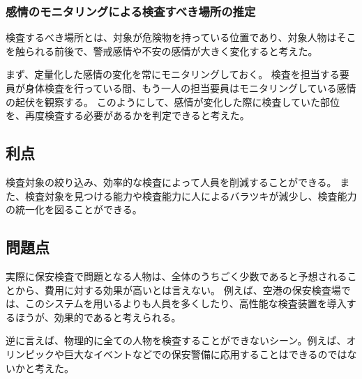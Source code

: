 \documentclass[a4paper,10pt]{jsarticle}
\begin{document}
\subsubsection{感情のモニタリングによる検査すべき場所の推定}
検査するべき場所とは、対象が危険物を持っている位置であり、対象人物はそこを触られる前後で、警戒感情や不安の感情が大きく変化すると考えた。

まず、定量化した感情の変化を常にモニタリングしておく。
検査を担当する要員が身体検査を行っている間、もう一人の担当要員はモニタリングしている感情の起伏を観察する。
このようにして、感情が変化した際に検査していた部位を、再度検査する必要があるかを判定できると考えた。

\subsection{利点}
検査対象の絞り込み、効率的な検査によって人員を削減することができる。
また、検査対象を見つける能力や検査能力に人によるバラツキが減少し、検査能力の統一化を図ることができる。

\subsection{問題点}
実際に保安検査で問題となる人物は、全体のうちごく少数であると予想されることから、費用に対する効果が高いとは言えない。
例えば、空港の保安検査場では、このシステムを用いるよりも人員を多くしたり、高性能な検査装置を導入するほうが、効果的であると考えられる。

逆に言えば、物理的に全ての人物を検査することができないシーン。例えば、オリンピックや巨大なイベントなどでの保安警備に応用することはできるのではないかと考えた。
\end{document}
